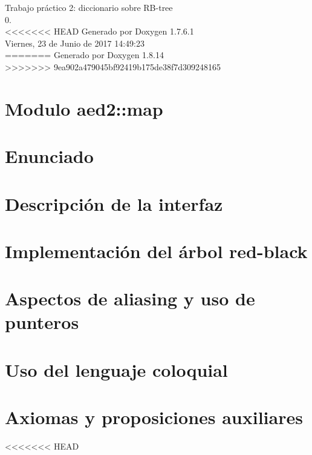 \documentclass[a4paper]{article}
\begin{document}
\hypersetup{pageanchor=false,citecolor=blue}
\begin{titlepage}
\vspace*{7cm}
\begin{center}
{\Large \-Trabajo práctico 2\-: diccionario sobre \-R\-B-\/tree \\[1ex]\large 0. }\\
\vspace*{1cm}
<<<<<<< HEAD
{\large \-Generado por Doxygen 1.7.6.1}\\
\vspace*{0.5cm}
{\small Viernes, 23 de Junio de 2017 14:49:23}\\
=======
{\large Generado por Doxygen 1.8.14}\\
>>>>>>> 9ea902a479045bf92419b175de38f7d309248165
\end{center}
\end{titlepage}
\tableofcontents
{}
\hypersetup{pageanchor=true,citecolor=blue}
\section{\-Modulo aed2\-:\-:map}
\label{index}\hypertarget{index}{}
\section{\-Enunciado}
\label{Enunciado}
\hypertarget{Enunciado}{}

\section{\-Descripción de la interfaz}
\label{Interfaz}
\hypertarget{Interfaz}{}

\section{\-Implementación del árbol red-\/black}
\label{Implementacion}
\hypertarget{Implementacion}{}

\section{\-Aspectos de aliasing y uso de punteros}
\label{Aliasing}
\hypertarget{Aliasing}{}

\section{\-Uso del lenguaje coloquial}
\label{Castellano}
\hypertarget{Castellano}{}

\section{\-Axiomas y proposiciones auxiliares}
\label{axiomas}
\hypertarget{axiomas}{}

<<<<<<< HEAD
\end{document}
